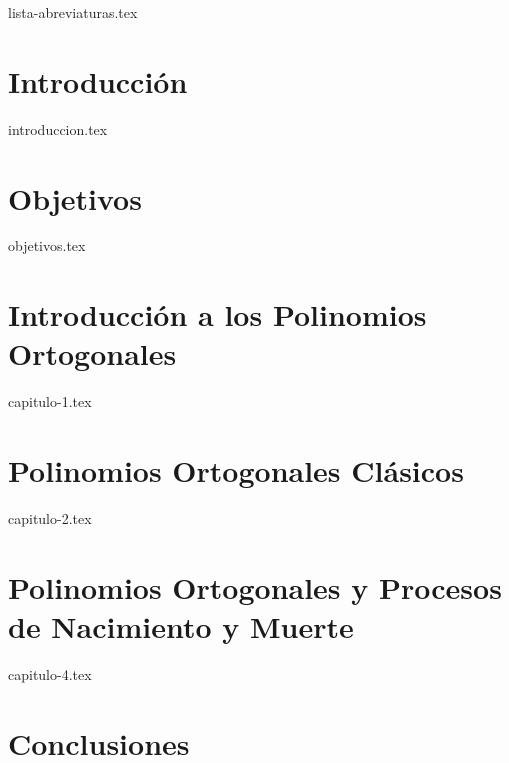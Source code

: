 \documentclass[twoside,openright,11pt]{report}
\begin{document}
{lista-abreviaturas.tex}

\listoffigures
\thispagestyle{plain}



\chapter*{Introducción}

{introduccion.tex}

\chapter*{Objetivos}
\label{chap:Objetivos}

{objetivos.tex}

\chapter{Introducción a los Polinomios Ortogonales}
\label{chap:introduccionPO}

{capitulo-1.tex}

\chapter{Polinomios Ortogonales Clásicos}
\label{chap:clasicos}

{capitulo-2.tex}

\chapter{Polinomios Ortogonales y Procesos de Nacimiento y Muerte}
\label{chap:POyPNM}

{capitulo-4.tex}

\chapter*{Conclusiones}
\label{chap:conclusiones}
\end{document}
